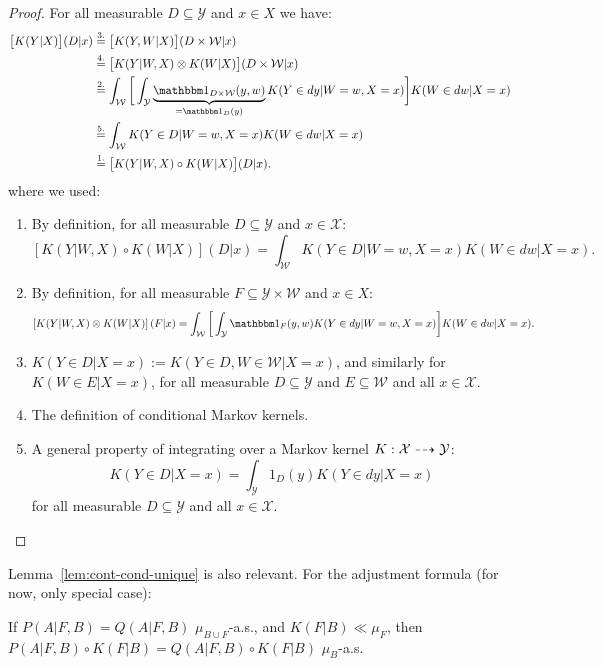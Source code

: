 \begin{proof}
For all measurable $D \subseteq \mathcal{Y}$ and $x \in X$ we have:
\begin{align*}
  \big[ K(Y | X) \big] (D | x) & \overset{3.}{=} \big[ K(Y, W | X)\big] (D \times \mathcal{W} | x) \\
  & \overset{4.}{=} \big[ K(Y | W, X) \otimes K(W | X)\big] (D \times \mathcal{W} | x) \\
  & \overset{2.}{=} \int_{\mathcal{W}} \bigg[ \int_{\mathcal{Y}} \underbrace{\I_{D \times \mathcal{W}}(y, w)}_{= \I_D(y)} K(Y \in d y | W = w, X = x)\bigg] K(W \in d w | X = x) \\
  & \overset{5.}{=} \int_{\mathcal{W}} K(Y \in D | W = w, X = x) K(W \in d w | X = x) \\
  & \overset{1.}{=} \big[  K(Y | W, X) \circ K(W | X)\big] (D | x).
\end{align*}
where we used:
\begin{enumerate}
  \item By definition, for all measurable $D \subseteq \mathcal{Y}$ and $x \in \mathcal{X}$: 
    \begin{equation*}
      \left[ K(Y | W, X) \circ K(W | X)\right](D | x) = \int_{\mathcal{W}} K(Y \in D | W = w, X = x) K(W \in d w | X = x).
    \end{equation*}
  \item By definition, for all measurable $F \subseteq \mathcal{Y} \times \mathcal{W}$ and $x \in X$:
    \begin{equation*}
      \left[ K(Y | W, X) \otimes K(W | X)\right](F | x) = \int_{\mathcal{W}} \bigg[ \int_{\mathcal{Y}} \I_{F}(y, w) K(Y \in d y | W = w, X = x) \bigg] K(W \in d w | X = x).
  \end{equation*}
\item  $K(Y \in D | X = x) := K(Y \in D, W \in \mathcal{W} | X = x)$, and similarly for $K(W \in E | X = x)$, for all measurable $D \subseteq \mathcal{Y}$ and $E \subseteq \mathcal{W}$ and all $x \in \mathcal{X}$.
\item The definition of conditional Markov kernels.  
\item A general property of integrating over a Markov kernel $K : \mathcal{X} \dashrightarrow \mathcal{Y}$:
  $$K(Y \in D | X=x) = \int_{\mathcal{Y}} 1_D(y) K(Y \in dy|X=x)$$
   for all measurable $D \subseteq \mathcal{Y}$ and all $x \in \mathcal{X}$.
\end{enumerate} 
\end{proof}
Lemma~\ref{lem:cont-cond-unique} is also relevant.
For the adjustment formula (for now, only special case):
\begin{Con}
  If $P(A|F,B) = Q(A|F,B)$ $\mu_{B\cup F}$-a.s., and $K(F|B) \ll \mu_F$, then $P(A|F,B) \circ K(F|B) = Q(A|F,B) \circ K(F|B)$ $\mu_B$-a.s.
\end{Con}

